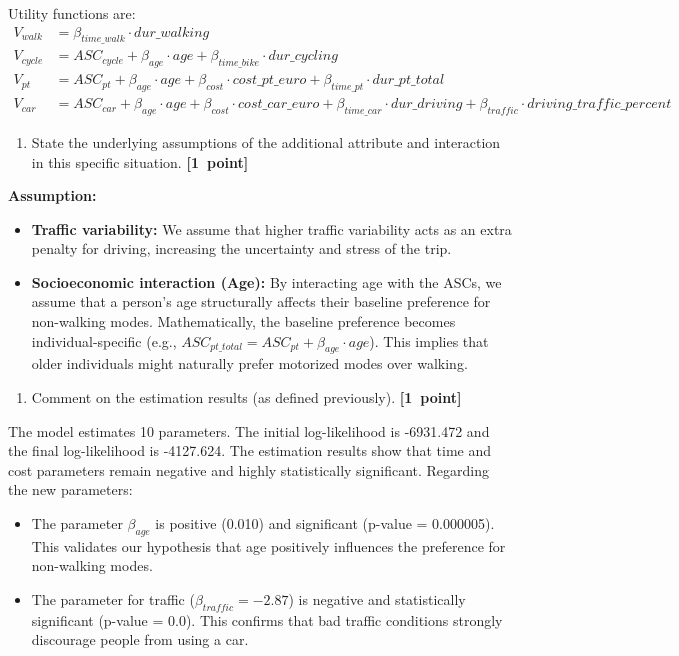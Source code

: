 \documentclass[11pt,a4paper]{article}
\begin{document}
Utility functions are:  
\begin{align*}
    V_{walk} &= \beta_{time\_walk} \cdot dur\_walking \\
    V_{cycle} &= ASC_{cycle} + \beta_{age} \cdot age + \beta_{time\_bike} \cdot dur\_cycling \\
    V_{pt} &= ASC_{pt} + \beta_{age} \cdot age + \beta_{cost} \cdot cost\_pt\_euro + \beta_{time\_pt} \cdot dur\_pt\_total \\
    V_{car} &= ASC_{car} + \beta_{age} \cdot age + \beta_{cost} \cdot cost\_car\_euro + \beta_{time\_car} \cdot dur\_driving + \beta_{traffic} \cdot driving\_traffic\_percent
\end{align*}

\begin{enumerate}
	\item State the underlying assumptions of the additional attribute and interaction in this specific situation. \textbf{[1~point]}
\end{enumerate}

\begin{minipage}{\textwidth}
\textbf{Assumption:}
\begin{itemize}
    \item \textbf{Traffic variability:} We assume that higher traffic variability acts as an extra penalty for driving, increasing the uncertainty and stress of the trip.
    \item \textbf{Socioeconomic interaction (Age):} By interacting age with the ASCs, we assume that a person's age structurally affects their baseline preference for non-walking modes. Mathematically, the baseline preference becomes individual-specific (e.g., $ASC_{pt\_total} = ASC_{pt} + \beta_{age} \cdot age$). This implies that older individuals might naturally prefer motorized modes over walking.
\end{itemize}
\end{minipage}

\begin{enumerate}[resume]
	\item Comment on the estimation results (as defined previously). \textbf{[1~point]}
\end{enumerate}

The model estimates 10 parameters. The initial log-likelihood is -6931.472 and the final log-likelihood is -4127.624. 
The estimation results show that time and cost parameters remain negative and highly statistically significant. 
Regarding the new parameters:
\begin{itemize}
    \item The parameter $\beta_{age}$ is positive (0.010) and significant (p-value = 0.000005). This validates our hypothesis that age positively influences the preference for non-walking modes. 
    \item The parameter for traffic ($\beta_{traffic} = -2.87$) is negative and statistically significant (p-value = 0.0). This confirms that bad traffic conditions strongly discourage people from using a car.
\end{itemize}
\end{document}
